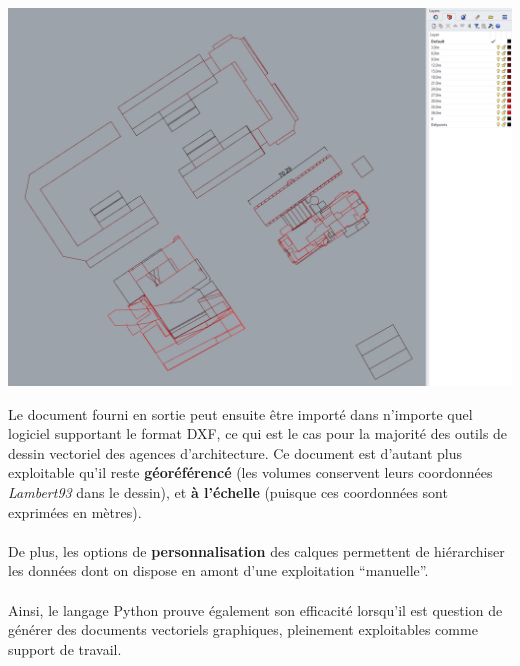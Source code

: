 \documentclass[
  11pt,
  french,
]{article}
\newcounter{customfigs}[section]
\newenvironment{customfigs}[1][] {
    \stepcounter{customfigs}
    Fig \arabic{section}. \arabic{customfigs} : }
\newcommand{\masked}{\vspace*{-\baselineskip}}
\begin{document}
\begin{tcolorbox}[title=\begin{customfigs} Fichier vectoriel organisé des emprises des volumes \end{customfigs}]

\begin{center}\includegraphics[width=1\linewidth]{__imgs/cad_1} \end{center}

\end{tcolorbox}

Le document fourni en sortie peut ensuite être importé dans n'importe
quel logiciel supportant le format DXF, ce qui est le cas pour la
majorité des outils de dessin vectoriel des agences d'architecture. Ce
document est d'autant plus exploitable qu'il reste \textbf{géoréférencé}
(les volumes conservent leurs coordonnées \emph{Lambert93} dans le
dessin), et \textbf{à l'échelle} (puisque ces coordonnées sont exprimées
en mètres).\\
~\\
De plus, les options de \textbf{personnalisation} des calques permettent
de hiérarchiser les données dont on dispose en amont d'une exploitation
``manuelle''.\\
~\\
Ainsi, le langage Python prouve également son efficacité lorsqu'il est
question de générer des documents vectoriels graphiques, pleinement
exploitables comme support de travail.

\newpage
\end{document}
